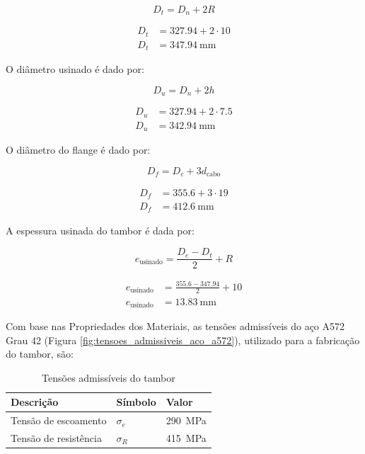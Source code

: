 \begin{equation}
  D_t = D_n + 2 R
  \label{eq:diametro_primitivo}
\end{equation}

\begin{align*}
  D_t & = \num{327.94} + 2 \cdot 10               \\
  D_t & = \boxed{\SI{347.94}{\milli\meter}}
\end{align*}

O diâmetro usinado é dado por:

\begin{equation}
  D_u = D_n + 2 h
  \label{eq:diametro_usinado}
\end{equation}

\begin{align*}
  D_u & = \num{327.94} + 2 \cdot \num{7.5}            \\
  D_u & = \boxed{\SI{342.94}{\milli\meter}}
\end{align*}

O diâmetro do flange é dado por:

\begin{equation}
  D_f = D_e + 3 d_{\text{cabo}}
  \label{eq:diametro_flange}
\end{equation}

\begin{align*}
  D_f & = \num{355.6} + 3 \cdot 19               \\
  D_f & = \boxed{\SI{412.6}{\milli\meter}}
\end{align*}

A espessura usinada do tambor é dada por:

\begin{equation}
  e_{\text{usinado}} = \frac{D_e - D_t}{2} + R
  \label{eq:espessura_usinada}
\end{equation}

\begin{align*}
  e_{\text{usinado}} & = \frac{\num{355.6} - \num{347.94}}{2} + 10  \\
  e_{\text{usinado}} & = \boxed{\SI{13.83}{\milli\meter}}
\end{align*}

Com base nas Propriedades dos Materiais, as tensões admissíveis do aço A572 Grau 42 (Figura \ref{fig:tensoes_admissiveis_aco_a572}), utilizado para a fabricação do tambor, são:

\begin{table}[H]
  \centering
  \caption{Tensões admissíveis do tambor}
  \label{tab:tensoes_tambor}
  \begin{tabularx}{\textwidth}{>{\centering\arraybackslash}X>{\centering\arraybackslash}X>{\centering\arraybackslash}X}
    \toprule
    Descrição             & Símbolo    & Valor                  \\
    \midrule
    Tensão de escoamento  & $\sigma_e$ & \SI{290}{\mega\pascal} \\
    Tensão de resistência & $\sigma_R$ & \SI{415}{\mega\pascal} \\
    \bottomrule
  \end{tabularx}
\end{table}

